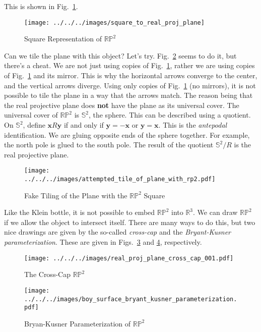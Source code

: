 \documentclass{article}
\theoremstyle{plain}
\theoremstyle{normal}
\begin{document}
        This is shown in Fig.~\ref{fig:square_to_real_proj_plane}.
        \begin{figure}
            \centering
            \texttt{[image: ../../../images/square\_to\_real\_proj\_plane]}
            \caption{Square Representation of $\mathbb{RP}^{2}$}
            \label{fig:square_to_real_proj_plane}
        \end{figure}
        Can we tile the plane with this object? Let's try.
        Fig.~\ref{fig:attempted_tile_of_plane_with_rp2} seems to do it, but
        there's a cheat. We are not just using copies of
        Fig.~\ref{fig:square_to_real_proj_plane}, rather we are using copies of
        Fig.~\ref{fig:square_to_real_proj_plane} and its mirror. This is why
        the horizontal arrows converge to the center, and the vertical arrows
        diverge. Using only copies of
        Fig.~\ref{fig:square_to_real_proj_plane} (no mirrors), it is not
        possible to tile the plane in a way that the arrows match. The reason
        being that the real projective plane does \textbf{not} have the plane
        as its universal cover. The universal cover of $\mathbb{RP}^{2}$ is
        $\mathbb{S}^{2}$, the sphere. This can be described using a
        quotient. On $\mathbb{S}^{2}$, define
        $\mathbf{x}R\mathbf{y}$ if and only if $\mathbf{y}=-\mathbf{x}$ or
        $\mathbf{y}=\mathbf{x}$. This is
        the \textit{antepodal} identification. We are gluing opposite ends of
        the sphere together. For example, the north pole is glued to the south
        pole. The result of the quotient $\mathbb{S}^{2}/R$ is the real
        projective plane.
        \begin{figure}
            \centering
            \texttt{[image: ../../../images/attempted\_tile\_of\_plane\_with\_rp2.pdf]}
            \caption{Fake Tiling of the Plane with the $\mathbb{RP}^{2}$ Square}
            \label{fig:attempted_tile_of_plane_with_rp2}
        \end{figure}
        \par\hfill\par
        Like the Klein bottle, it is not possible to embed
        $\mathbb{RP}^{2}$ into $\mathbb{R}^{3}$. We can draw $\mathbb{RP}^{2}$
        if we allow the object to intersect itself. There are many ways to
        do this, but two nice drawings are given by the so-called
        \textit{cross-cap} and the
        \textit{Bryant-Kusner parameterization}. These are given in
        Figs.~\ref{fig:real_proj_plane_cross_cap_001} and
        \ref{fig:boy_surface_bryant_kusner_parameterization},
        respectively.
        \begin{figure}
            \centering
            \texttt{[image: ../../../images/real\_proj\_plane\_cross\_cap\_001.pdf]}
            \caption{The Cross-Cap $\mathbb{RP}^{2}$}
            \label{fig:real_proj_plane_cross_cap_001}
        \end{figure}
        \begin{figure}
            \centering
            \texttt{[image: ../../../images/boy\_surface\_bryant\_kusner\_parameterization.pdf]}
            \caption{Bryan-Kusner Parameterization of $\mathbb{RP}^{2}$}
            \label{fig:boy_surface_bryant_kusner_parameterization}
        \end{figure}
\end{document}
